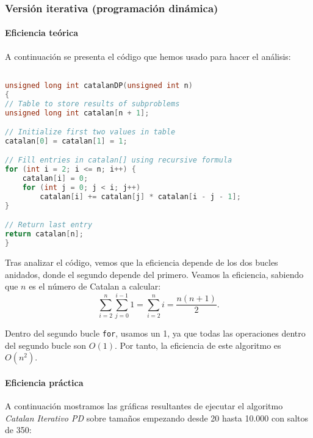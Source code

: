 \documentclass[a4paper,12pt]{article} %
\begin{document}
\subsubsection{Versión iterativa (programación dinámica)}

\paragraph{Eficiencia teórica}

A continuación se presenta el código que hemos usado para hacer el análisis:

\begin{lstlisting}[language=C, caption={Código de Catalan iterativo (programación dinámica)}]

unsigned long int catalanDP(unsigned int n)
{
// Table to store results of subproblems
unsigned long int catalan[n + 1];

// Initialize first two values in table
catalan[0] = catalan[1] = 1;

// Fill entries in catalan[] using recursive formula
for (int i = 2; i <= n; i++) {
	catalan[i] = 0;
	for (int j = 0; j < i; j++)
		catalan[i] += catalan[j] * catalan[i - j - 1];
}

// Return last entry
return catalan[n];
}	
	\end{lstlisting}

	Tras analizar el código, vemos que la eficiencia depende de los dos bucles anidados, donde el 
	segundo depende del primero. Veamos la eficiencia, sabiendo que \(n\) es el número de Catalan a calcular:
	\[
	\sum_{i=2}^{n} \sum_{j=0}^{i-1} 1 = \sum_{i=2}^{n} i = \frac{n(n+1)}{2}.
	\]
	
	Dentro del segundo bucle \texttt{for}, usamos un 1, ya que todas las operaciones dentro del segundo 
	bucle son \(\textit{O}(1)\). Por tanto, la eficiencia de este algoritmo es \(\textit{O}(n^2)\).
\paragraph{Eficiencia práctica}

A continuación mostramos las gráficas resultantes de ejecutar el algoritmo \textit{Catalan Iterativo PD}
sobre tamaños empezando desde 20 hasta 10.000 con saltos de 350:
\end{document}
